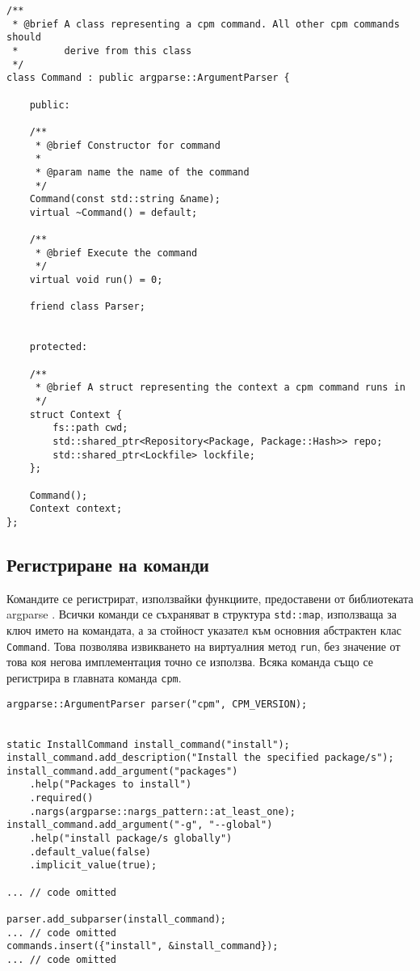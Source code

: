 \begin{lstlisting}[style=cpp,
				   caption=Абстрактен клас за команда,
				   label={lst:command}]
/**
 * @brief A class representing a cpm command. All other cpm commands should
 * 		  derive from this class
 */
class Command : public argparse::ArgumentParser {

	public:

	/**
	 * @brief Constructor for command
	 * 
	 * @param name the name of the command
	 */
	Command(const std::string &name);
	virtual ~Command() = default;

	/**
	 * @brief Execute the command
	 */
	virtual void run() = 0;

	friend class Parser;


	protected:

	/**
	 * @brief A struct representing the context a cpm command runs in
	 */
	struct Context {
		fs::path cwd;
		std::shared_ptr<Repository<Package, Package::Hash>> repo;
		std::shared_ptr<Lockfile> lockfile;
	};

	Command();
	Context context;
};
\end{lstlisting}


\subsection{Регистриране на команди}

Командите се регистрират, използвайки функциите, предоставени от библиотеката
argparse . Всички команди се съхраняват в структура
\texttt{std::map}, използваща за ключ името на командата, а за стойност указател
към основния абстрактен клас \texttt{Command}. Това позволява извикването на
виртуалния метод \texttt{run}, без значение от това коя негова имплементация
точно се използва. Всяка команда също се регистрира в главната команда
\texttt{cpm}.

\begin{lstlisting}[style=cpp,
				   caption=Създаване и регистриране на команда,
				   label={lst:register-command}]
argparse::ArgumentParser parser("cpm", CPM_VERSION);


static InstallCommand install_command("install");
install_command.add_description("Install the specified package/s");
install_command.add_argument("packages")
	.help("Packages to install")
	.required()
	.nargs(argparse::nargs_pattern::at_least_one);
install_command.add_argument("-g", "--global")
	.help("install package/s globally")
	.default_value(false)
	.implicit_value(true);

... // code omitted

parser.add_subparser(install_command);
... // code omitted
commands.insert({"install", &install_command});
... // code omitted
\end{lstlisting}


